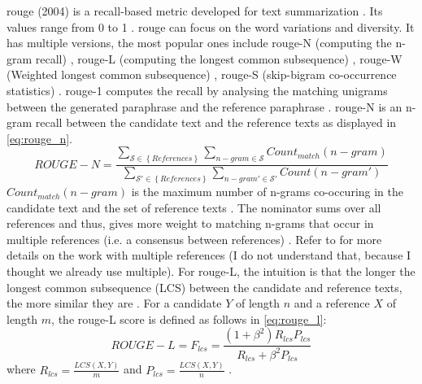 \ac{rouge} (2004) is a recall-based metric developed for text summarization 
\citep{zhou_paraphrase_2021,palivela_optimization_2021,kurt_pehlivanoglu_comparative_2024,lin_rouge_2004}.
Its values range from 0 to 1 \citep{kurt_pehlivanoglu_comparative_2024}.
\ac{rouge} can focus on the word variations and diversity.
It has multiple versions, the most popular ones include 
\ac{rouge}-N (computing the n-gram recall) \citep{zhou_paraphrase_2021,palivela_optimization_2021,kurt_pehlivanoglu_comparative_2024}, 
\ac{rouge}-L (computing the longest common subsequence) \citep{zhou_paraphrase_2021,palivela_optimization_2021,kurt_pehlivanoglu_comparative_2024}, 
\ac{rouge}-W (Weighted longest common subsequence) \citep{palivela_optimization_2021}, 
\ac{rouge}-S (skip-bigram co-occurrence statistics) \citep{palivela_optimization_2021}.
\ac{rouge}-1 computes the recall by analysing the matching unigrams between the generated paraphrase and the reference paraphrase \citep{palivela_optimization_2021,kurt_pehlivanoglu_comparative_2024}.
\ac{rouge}-N is an n-gram recall between the candidate text and the reference texts \citep{lin_rouge_2004} as displayed in \autoref{eq:rouge_n}.
\begin{equation}
    ROUGE-N = \frac{\sum_{\mathcal{S} \in \left\{ References \right\}}\sum_{n-gram \in\mathcal{S}}Count_{match}(n-gram)}{\sum_{\mathcal{S'} \in \left\{ References \right\}}\sum_{n-gram' \in\mathcal{S'}}Count(n-gram')}
\label{eq:rouge_n}
\end{equation}
$Count_{match}(n-gram)$ is the maximum number of n-grams co-occuring in the candidate text and the set of reference texts \citep{lin_rouge_2004}.
The nominator sums over all references and thus, gives more weight to matching n-grams that occur in multiple references (i.e. a consensus between references) \citep{lin_rouge_2004}.
Refer to \citet{lin_rouge_2004} for more details on the work with multiple references (I do not understand that, because I thought we already use multiple).
For \ac{rouge}-L, the intuition is that the longer the longest common subsequence (LCS) between the candidate and reference texts, the more similar they are \citep{lin_rouge_2004}.
For a candidate $Y$ of length $n$ and a reference $X$ of length $m$, the \ac{rouge}-L score is defined as follows in \autoref{eq:rouge_l}:
\begin{equation}
    ROUGE-L = F_{lcs} = \frac{(1 + \beta^2)R_{lcs}P_{lcs}}{R_{lcs} + \beta^2 P_{lcs}}
\label{eq:rouge_l}
\end{equation}
where $R_{lcs} = \frac{LCS(X,Y)}{m}$ and $P_{lcs} = \frac{LCS(X,Y)}{n}$ \citep{lin_rouge_2004}.
